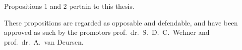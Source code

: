 \bigskip \noindent
{\small
Propositions 1 and 2 pertain to this thesis.
}

\bigskip \noindent
{\small
These propositions are regarded as opposable and defendable, and have been approved as such by the
promotors prof.\ dr.\ S.\ D.\ C.\ Wehner and prof.\ dr.\ A.\ van Deursen.
}
